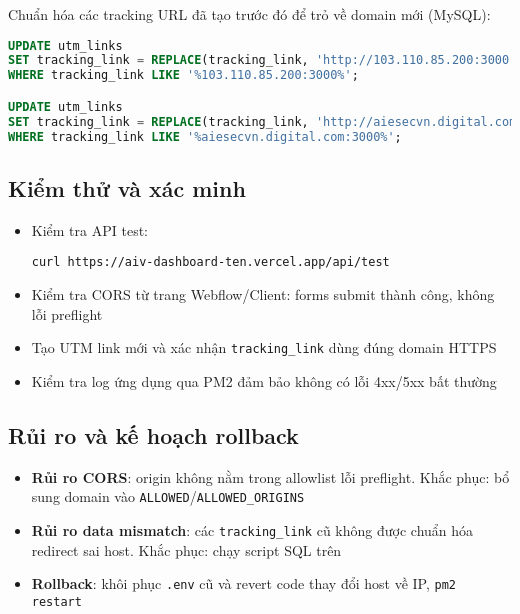 \documentclass[12pt,a4paper]{article}
\begin{document}
Chuẩn hóa các tracking URL đã tạo trước đó để trỏ về domain mới (MySQL):
\begin{lstlisting}[language=sql,caption=Chuẩn hóa tracking_link về domain Vercel]
UPDATE utm_links 
SET tracking_link = REPLACE(tracking_link, 'http://103.110.85.200:3000', 'https://aiv-dashboard-ten.vercel.app')
WHERE tracking_link LIKE '%103.110.85.200:3000%';

UPDATE utm_links 
SET tracking_link = REPLACE(tracking_link, 'http://aiesecvn.digital.com:3000', 'https://aiv-dashboard-ten.vercel.app')
WHERE tracking_link LIKE '%aiesecvn.digital.com:3000%';
\end{lstlisting}

\subsection{Kiểm thử và xác minh}

\begin{itemize}
  \item Kiểm tra API test:
\begin{lstlisting}
curl https://aiv-dashboard-ten.vercel.app/api/test
\end{lstlisting}
  \item Kiểm tra CORS từ trang Webflow/Client: forms submit thành công, không lỗi preflight
  \item Tạo UTM link mới và xác nhận \texttt{tracking\_link} dùng đúng domain HTTPS
  \item Kiểm tra log ứng dụng qua PM2 đảm bảo không có lỗi 4xx/5xx bất thường
\end{itemize}

\subsection{Rủi ro và kế hoạch rollback}

\begin{itemize}
  \item \textbf{Rủi ro CORS}: origin không nằm trong allowlist \Rightarrow lỗi preflight. Khắc phục: bổ sung domain vào \texttt{ALLOWED}/\texttt{ALLOWED\_ORIGINS}
  \item \textbf{Rủi ro data mismatch}: các \texttt{tracking\_link} cũ không được chuẩn hóa \Rightarrow redirect sai host. Khắc phục: chạy script SQL trên
  \item \textbf{Rollback}: khôi phục \texttt{.env} cũ và revert code thay đổi host về IP, \texttt{pm2 restart}
\end{itemize}
\end{document}
